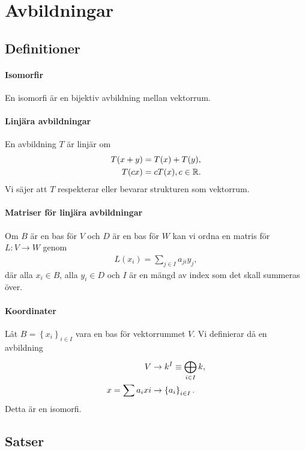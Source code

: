 \section{Avbildningar}

\subsection{Definitioner}

\paragraph{Isomorfir}
En isomorfi är en bijektiv avbildning mellan vektorrum.

\paragraph{Linjära avbildningar}
En avbildning $T$ är linjär om
\begin{align*}
	T(x + y) = T(x) + T(y), \\
	T(cx) = cT(x), c\in\mathbb{R}.
\end{align*}
Vi säjer att $T$ respekterar eller bevarar strukturen som vektorrum.

\paragraph{Matriser för linjära avbildningar}
Om $B$ är en bas för $V$ och $D$ är en bas för $W$ kan vi ordna en matris för $L: V\to W$ genom
\begin{align*}
	L(x_{i}) = \sum\limits_{j\in I}a_{ji}y_{j},
\end{align*}
där alla $x_{i}\in B$, alla $y_{i}\in D$ och $I$ är en mängd av index som det skall summeras över.

\paragraph{Koordinater}
Låt $B = \left\{x_{i}\right\}_{i\in I}$ vara en bas för vektorrummet $V$. Vi definierar då en avbildning
\begin{align*}
	V                  &\to k^{I}\equiv \bigoplus\limits_{i\in I}^{}k, \\
	x = \sum a_{i}x{i} &\to \left\{a_{i}\right\}_{i\in I}.
\end{align*}
Detta är en isomorfi.

\subsection{Satser}

